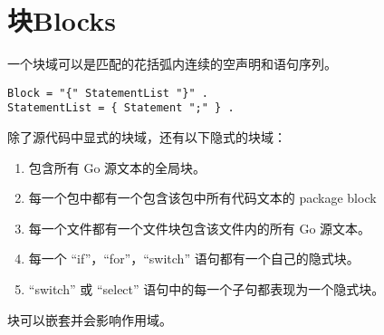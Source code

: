 \chapter{块Blocks}
一个块域可以是匹配的花括弧内连续的空声明和语句序列。
\begin{lstlisting}[style=EBNF]
Block = "{" StatementList "}" .
StatementList = { Statement ";" } .
\end{lstlisting}

除了源代码中显式的块域，还有以下隐式的块域：
\begin{enumerate}
\item 包含所有 Go 源文本的全局块。
\item 每一个包中都有一个包含该包中所有代码文本的 package block
\item 每一个文件都有一个文件块包含该文件内的所有 Go 源文本。
\item 每一个 ``if''，``for''，``switch'' 语句都有一个自己的隐式块。
\item  ``switch'' 或 ``select'' 语句中的每一个子句都表现为一个隐式块。
\end{enumerate}
块可以嵌套并会影响作用域。